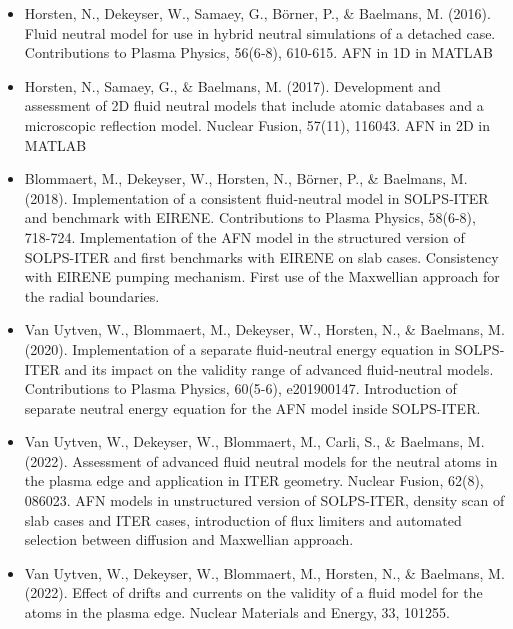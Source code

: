 \begin{itemize}
    \item Horsten, N., Dekeyser, W., Samaey, G., B\"orner, P., \& Baelmans, M. (2016). Fluid neutral model for use in hybrid neutral simulations of a detached case. Contributions to Plasma Physics, 56(6‐8), 610-615. \newline \newline
    AFN in 1D in MATLAB
    \item Horsten, N., Samaey, G., \& Baelmans, M. (2017). Development and assessment of 2D fluid neutral models that include atomic databases and a microscopic reflection model. Nuclear Fusion, 57(11), 116043. \newline \newline
    AFN in 2D in MATLAB
    \item Blommaert, M., Dekeyser, W., Horsten, N., B\"orner, P., \& Baelmans, M. (2018). Implementation of a consistent fluid‐neutral model in SOLPS‐ITER and benchmark with EIRENE. Contributions to Plasma Physics, 58(6-8), 718-724. \newline \newline
    Implementation of the AFN model in the structured version of SOLPS-ITER and first benchmarks with EIRENE on slab cases. Consistency with EIRENE pumping mechanism. First use of the Maxwellian approach for the radial boundaries.
    \item Van Uytven, W., Blommaert, M., Dekeyser, W., Horsten, N., \& Baelmans, M. (2020). Implementation of a separate fluid‐neutral energy equation in SOLPS‐ITER and its impact on the validity range of advanced fluid‐neutral models. Contributions to Plasma Physics, 60(5-6), e201900147. \newline \newline
    Introduction of separate neutral energy equation for the AFN model inside SOLPS-ITER.
    \item Van Uytven, W., Dekeyser, W., Blommaert, M., Carli, S., \& Baelmans, M. (2022). Assessment of advanced fluid neutral models for the neutral atoms in the plasma edge and application in ITER geometry. Nuclear Fusion, 62(8), 086023. \newline \newline
    AFN models in unstructured version of SOLPS-ITER, density scan of slab cases and ITER cases, introduction of flux limiters and automated selection between diffusion and Maxwellian approach.
    \item Van Uytven, W., Dekeyser, W., Blommaert, M., Horsten, N., \& Baelmans, M. (2022). Effect of drifts and currents on the validity of a fluid model for the atoms in the plasma edge. Nuclear Materials and Energy, 33, 101255. \newline \newline

\end{itemize}
